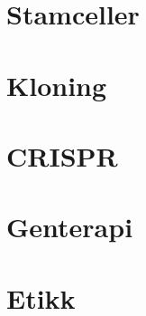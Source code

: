     \section{Stamceller}
    

    \section{Kloning}
    

    \section{CRISPR}
    

    \section{Genterapi}
    

    \section{Etikk}
    

